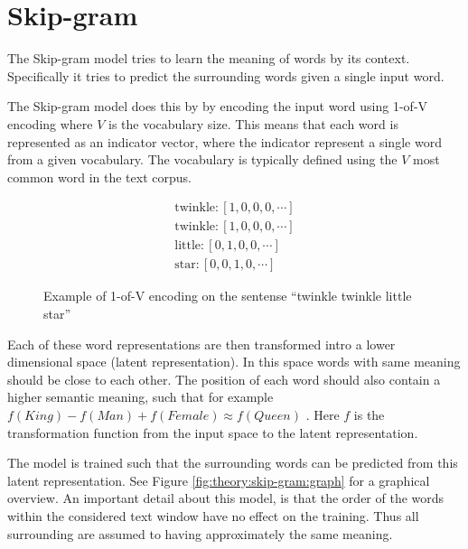 
\section{Skip-gram}

The Skip-gram model tries to learn the meaning of words by its context. Specifically it tries to predict the surrounding words given a single input word.

The Skip-gram model does this by by encoding the input word using 1-of-V encoding where $V$ is the vocabulary size. This means that each word is represented as an indicator vector, where the indicator represent a single word from a given vocabulary. The vocabulary is typically defined using the $V$ most common word in the text corpus. 
\begin{figure}[h]
\begin{equation*}
\begin{aligned}
\text{twinkle}: \left[1, 0, 0, 0, \cdots \right] \\
\text{twinkle}: \left[1, 0, 0, 0, \cdots \right] \\
\text{little}: \left[0, 1, 0, 0, \cdots \right] \\
\text{star}: \left[0, 0, 1, 0, \cdots \right]
\end{aligned}
\end{equation*}
\caption{Example of 1-of-V encoding on the sentense ``twinkle twinkle little star''}
\end{figure}

Each of these word representations are then transformed intro a lower dimensional space (latent representation). In this space words with same meaning should be close to each other. The position of each word should also contain a higher semantic meaning, such that for example $f(King) - f(Man) + f(Female) \approx f(Queen)$ \cite{word2vec-comparing}. Here $f$ is the transformation function from the input space to the latent representation.

The model is trained such that the surrounding words can be predicted from this latent representation. See Figure \ref{fig:theory:skip-gram:graph} for a graphical overview. An important detail about this model, is that the order of the words within the considered text window have no effect on the training. Thus all surrounding are assumed to having approximately the same meaning.

